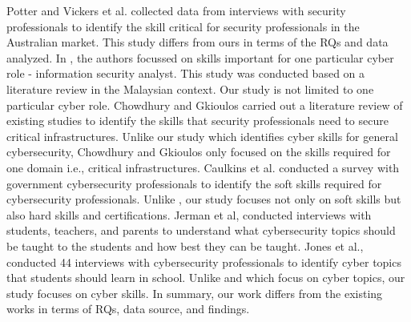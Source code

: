 Potter and Vickers et al. \cite{12} collected data from interviews with security professionals to identify the skill critical for security professionals in the Australian market. This study differs from ours in terms of the RQs and data analyzed. In \cite{15}, the authors focussed on skills important for one particular cyber role - information security analyst. This study was conducted based on a literature review in the Malaysian context. Our study is not limited to one particular cyber role. Chowdhury and Gkioulos \cite{29} carried out a literature review of existing studies to identify the skills that security professionals need to secure critical infrastructures. Unlike our study which identifies cyber skills for general cybersecurity, Chowdhury and Gkioulos \cite{29} only focused on the skills required for one domain i.e., critical infrastructures. Caulkins et al. \cite{caulkins2019cybersecurity} conducted a survey with government cybersecurity professionals to identify the soft skills required for cybersecurity professionals. Unlike \cite{caulkins2019cybersecurity}, our study focuses not only on soft skills but also hard skills and certifications. Jerman et al, \cite{jerman2022cybersecurity} conducted interviews with students, teachers, and parents to understand what cybersecurity topics should be taught to the students and how best they can be taught. Jones et al., \cite{5} conducted 44 interviews with cybersecurity professionals to identify cyber topics that students should learn in school. Unlike \cite{5} and \cite{jerman2022cybersecurity} which focus on cyber topics, our study focuses on cyber skills. In summary, our work differs from the existing works in terms of RQs, data source, and findings.